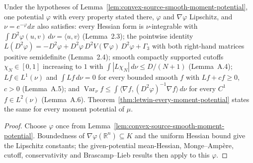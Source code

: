 \begin{lemma}
  \label{lem:convex-source-smooth-moment-calculus}
  \leanok
  Under the hypotheses of Lemma~\ref{lem:convex-source-smooth-moment-potential}, one potential $\varphi$
  with every property stated there, $\varphi$ and $\nabla\varphi$ Lipschitz, and $\nu=e^{-\varphi}dx$ also
  satisfies: every Hessian form is $\nu$-integrable with $\int D^2\varphi(u,v)\,d\nu=\langle u,v\rangle$
  (Lemma~2.3); the pointwise identity $L(D^2\varphi)=-D^2\varphi+D^2\varphi\,D^2V(\nabla\varphi)\,D^2\varphi
  +\Gamma_3$ with both right-hand matrices positive semidefinite (Lemma~2.4); smooth compactly supported
  cutoffs $\chi_N\in[0,1]$ increasing to $1$ with $\int|L\chi_N|\,d\nu\le D/(N+1)$ (Lemma~A.4); $Lf\in
  L^1(\nu)$ and $\int Lf\,d\nu=0$ for every bounded smooth $f$ with $Lf+cf\ge0$, $c>0$ (Lemma~A.5); and
  $\operatorname{Var}_\nu f\le\int\langle\nabla f,(D^2\varphi)^{-1}\nabla f\rangle\,d\nu$ for every
  $C^1$ $f\in L^2(\nu)$ (Lemma~A.6). Theorem~\ref{thm:letwin-every-moment-potential} states the same for every
  moment potential of $\mu$.
\end{lemma}
\begin{proof}
  \leanok
  Choose $\varphi$ once from Lemma~\ref{lem:convex-source-smooth-moment-potential}. Boundedness of
  $\nabla\varphi(\mathbb R^n)\subseteq K$ and the uniform Hessian bound give the Lipschitz constants; the
  given-potential mean-Hessian, Monge--Amp\`ere, cutoff, conservativity and Brascamp--Lieb results then
  apply to this $\varphi$.
\end{proof}

